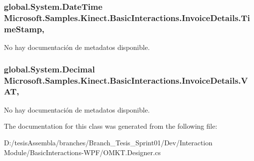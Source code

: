 \hypertarget{class_microsoft_1_1_samples_1_1_kinect_1_1_basic_interactions_1_1_invoice_details_a2bc0ccef382ca15dd09ae5260b32a17e}{
\subsubsection[{Time\-Stamp}]{\setlength{\rightskip}{0pt plus 5cm}global.\-System.\-Date\-Time Microsoft.\-Samples.\-Kinect.\-Basic\-Interactions.\-Invoice\-Details.\-Time\-Stamp\hspace{0.3cm}{\ttfamily [get]}, {\ttfamily [set]}}}\label{class_microsoft_1_1_samples_1_1_kinect_1_1_basic_interactions_1_1_invoice_details_a2bc0ccef382ca15dd09ae5260b32a17e}


No hay documentación de metadatos disponible. 

\hypertarget{class_microsoft_1_1_samples_1_1_kinect_1_1_basic_interactions_1_1_invoice_details_a83bdeda4946c9a7d995b74a5cc964f85}{
\subsubsection[{V\-A\-T}]{\setlength{\rightskip}{0pt plus 5cm}global.\-System.\-Decimal Microsoft.\-Samples.\-Kinect.\-Basic\-Interactions.\-Invoice\-Details.\-V\-A\-T\hspace{0.3cm}{\ttfamily [get]}, {\ttfamily [set]}}}\label{class_microsoft_1_1_samples_1_1_kinect_1_1_basic_interactions_1_1_invoice_details_a83bdeda4946c9a7d995b74a5cc964f85}


No hay documentación de metadatos disponible. 



The documentation for this class was generated from the following file\-:\begin{DoxyCompactItemize}
\item 
D\-:/tesis\-Assembla/branches/\-Branch\-\_\-\-Tesis\-\_\-\-Sprint01/\-Dev/\-Interaction Module/\-Basic\-Interactions-\/\-W\-P\-F/O\-M\-K\-T.\-Designer.\-cs\end{DoxyCompactItemize}

